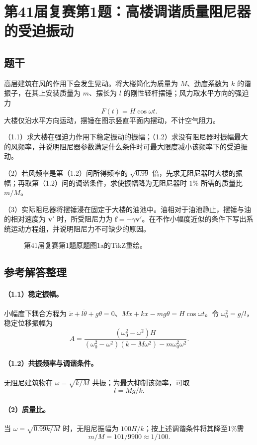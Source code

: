 \section{第41届复赛第1题：高楼调谐质量阻尼器的受迫振动}
\subsection{题干}
高层建筑在风的作用下会发生晃动。将大楼简化为质量为 $M$、劲度系数为 $k$ 的谐振子，在其上安装质量为 $m$、摆长为 $l$ 的刚性轻杆摆锤；风力取水平方向的强迫力
\[
F(t)=H\cos\omega t.
\]
大楼仅沿水平方向运动，摆锤在图示竖直平面内摆动，不计空气阻力。

（1.1）求大楼在强迫力作用下稳定振动的振幅；（1.2）求没有阻尼器时振幅最大的风频率，并说明阻尼器参数满足什么条件时可最大限度减小该频率下的受迫振动。

（2）若风频率是第（1.2）问所得频率的 $\sqrt{0.99}$ 倍，先求无阻尼器时大楼的振幅；再取第（1.2）问的调谐条件，求使振幅降为无阻尼器时 $1\%$ 所需的质量比 $m/M$。

（3）实际阻尼器将摆锤浸在固定于大楼的油池中。油相对于油池静止，摆锤与油的相对速度为 $\boldsymbol v'$ 时，所受阻尼力为 $\boldsymbol f=-\gamma\boldsymbol v'$。在不作小幅度近似的条件下写出系统运动方程组，并说明阻尼力不可缺少的原因。
\begin{figure}[htbp]\centering\caption{第41届复赛第1题原题图1a的TikZ重绘。}\end{figure}
\subsection{参考解答整理}
\paragraph{（1.1）稳定振幅。}
小幅度下耦合方程为 $\ddot x+l\ddot\theta+g\theta=0$、$M\ddot x+kx-mg\theta=H\cos\omega t$。令 $\omega_0^2=g/l$，稳定位移振幅为
\[A=\frac{(\omega_0^2-\omega^2)H}{(\omega_0^2-\omega^2)(k-M\omega^2)-m\omega_0^2\omega^2}.\]
\paragraph{（1.2）共振频率与调谐条件。}
无阻尼建筑物在 $\omega=\sqrt{k/M}$ 共振；为最大抑制该频率，可取 \[\boxed{l=Mg/k}.\]
\paragraph{（2）质量比。}
当 $\omega=\sqrt{0.99k/M}$ 时，无阻尼振幅为 $100H/k$；按上述调谐条件将其降至1\%需 \[\boxed{m/M=101/9900\approx1/100}.\]
